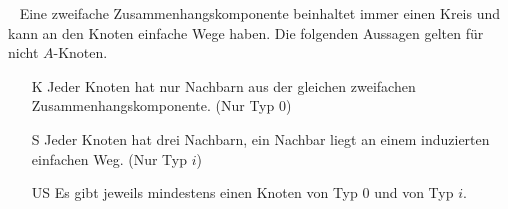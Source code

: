 \begin{defi}~\newline
Eine zweifache Zusammenhangskomponente beinhaltet immer einen Kreis und kann an den Knoten einfache Wege haben. Die folgenden Aussagen gelten für nicht $A$-Knoten. 
\begin{itemize}
\item[K] Jeder Knoten hat nur Nachbarn aus der gleichen zweifachen Zusammenhangskomponente. (Nur Typ $0$)
\item[S] Jeder Knoten hat drei Nachbarn, ein Nachbar liegt an einem induzierten einfachen Weg. (Nur Typ $i$)
\item[US] Es gibt jeweils mindestens einen Knoten von Typ $0$ und von Typ $i$.
\end{itemize}
\end{defi}

